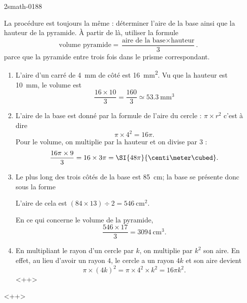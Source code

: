 
\begin{corrige}{2smath-0188}


La procédure est toujours la même : déterminer l'aire de la base ainsi que la hauteur de la pyramide. À partir de là, utiliser la formule
\begin{equation}
    \text{volume pyramide}=\frac{ \text{aire de la base}\times \text{hauteur} }{ 3 }.
\end{equation}
parce que la pyramide entre trois fois dans le prisme correspondant.
\begin{enumerate}
    \item
        L'aire d'un carré de \SI{4}{\milli\meter} de côté est \SI{16}{\milli\meter\squared}. Vu que la hauteur est \SI{10}{\milli\meter}, le volume est
        \begin{equation}
            \frac{ 16\times 10 }{ 3 }=\frac{ 160 }{ 3 }\simeq \SI{53.3}{\milli\meter\cubed}
        \end{equation}
    \item
        L'aire de la base est donné par la formule de l'aire du cercle : \( \pi\times r^2\) c'est à dire
        \begin{equation}
            \pi\times 4^2=16\pi.
        \end{equation}
        Pour le volume, on multiplie par la hauteur et on divise par \( 3\) :
        \begin{equation}
            \frac{ 16\pi\times 9 }{ 3 }=16\times 3\pi=\SI{48\pi}{\centi\meter\cubed}.
        \end{equation}
    \item
        Le plus long des trois côtés de la base est \SI{85}{\centi\meter}; la base se présente donc sous la forme
        \begin{center}
            
        \end{center}
        L'aire de cela est \( (84\times 13)\div 2=\SI{546}{\centi\meter\squared}\).

        En ce qui concerne le volume de la pyramide,
        \begin{equation}
            \frac{ 546\times 17 }{ 3 }=\SI{3094}{\centi\meter\cubed}.
        \end{equation}
    \item
    En multipliant le rayon d'un cercle par \( k\), on multiplie par \( k^2\) son aire. En effet, au lieu d'avoir un rayon \( 4\), le cercle a un rayon \( 4k\) et son aire devient
    \begin{equation}
        \pi\times (4k)^2=\pi\times 4^2\times k^2=16\pi k^2.
    \end{equation}
    <++>
\end{enumerate}
<++>

\end{corrige}

